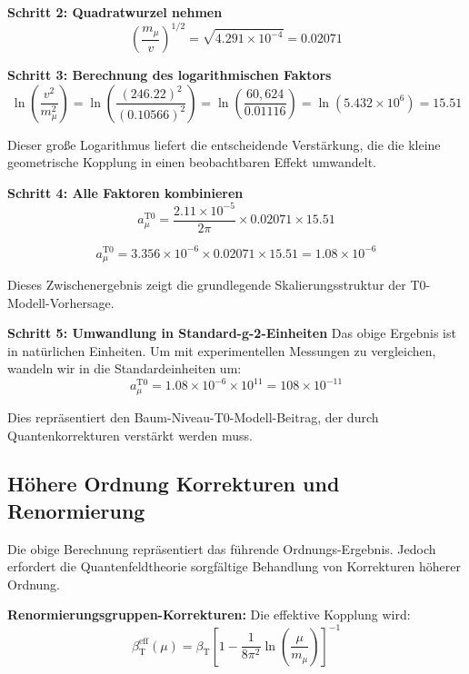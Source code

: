 \documentclass[12pt,a4paper]{article}
\newcommand{\betaT}{\beta_{\text{T}}}
\begin{document}
\textbf{Schritt 2: Quadratwurzel nehmen}
\begin{equation}
\left(\frac{m_\mu}{v}\right)^{1/2} = \sqrt{4.291 \times 10^{-4}} = 0.02071
\end{equation}

\textbf{Schritt 3: Berechnung des logarithmischen Faktors}
\begin{equation}
\ln\left(\frac{v^2}{m_\mu^2}\right) = \ln\left(\frac{(246.22)^2}{(0.10566)^2}\right) = \ln\left(\frac{60,624}{0.01116}\right) = \ln(5.432 \times 10^6) = 15.51
\end{equation}

Dieser große Logarithmus liefert die entscheidende Verstärkung, die die kleine geometrische Kopplung in einen beobachtbaren Effekt umwandelt.

\textbf{Schritt 4: Alle Faktoren kombinieren}
\begin{equation}
a_\mu^{\text{T0}} = \frac{2.11 \times 10^{-5}}{2\pi} \times 0.02071 \times 15.51
\end{equation}

\begin{equation}
a_\mu^{\text{T0}} = 3.356 \times 10^{-6} \times 0.02071 \times 15.51 = 1.08 \times 10^{-6}
\end{equation}

Dieses Zwischenergebnis zeigt die grundlegende Skalierungsstruktur der T0-Modell-Vorhersage.

\textbf{Schritt 5: Umwandlung in Standard-g-2-Einheiten}
Das obige Ergebnis ist in natürlichen Einheiten. Um mit experimentellen Messungen zu vergleichen, wandeln wir in die Standardeinheiten um:
\begin{equation}
a_\mu^{\text{T0}} = 1.08 \times 10^{-6} \times 10^{11} = 108 \times 10^{-11}
\end{equation}

Dies repräsentiert den Baum-Niveau-T0-Modell-Beitrag, der durch Quantenkorrekturen verstärkt werden muss.

\subsection{Höhere Ordnung Korrekturen und Renormierung}

Die obige Berechnung repräsentiert das führende Ordnungs-Ergebnis. Jedoch erfordert die Quantenfeldtheorie sorgfältige Behandlung von Korrekturen höherer Ordnung.

\textbf{Renormierungsgruppen-Korrekturen:}
Die effektive Kopplung wird:
\begin{equation}
\betaT^{\text{eff}}(\mu) = \betaT \left[1 - \frac{1}{8\pi^2} \ln\left(\frac{\mu}{m_\mu}\right)\right]^{-1}
\end{equation}
\end{document}
